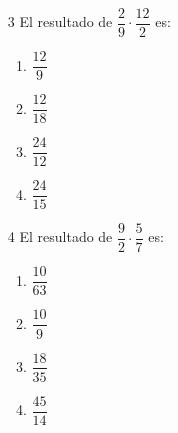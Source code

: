 \documentclass[12pt]{article}
\begin{document}
\begin{multicols}{2}
		\begin{enumerate}
		\item [3]El resultado de $\dfrac{2}{9} \cdot \dfrac{12}{2}$	es:
			\begin{enumerate}
			\item $\dfrac{12}{9}$\\
			\item $\dfrac{12}{18}$\\
			\item $\dfrac{24}{12}$\\
			\item $\dfrac{24}{15}$\\ 
	\end{enumerate}
	\end{enumerate}
\begin{enumerate}
	\item [4]El resultado de $\dfrac{9}{2} \cdot \dfrac{5}{7}$	es:
	\begin{enumerate}
		\item $\dfrac{10}{63}$\\
		\item $\dfrac{10}{9}$\\
		\item $\dfrac{18}{35}$\\
		\item $\dfrac{45}{14}$\\
	\end{enumerate}
\end{enumerate}
\end{multicols}	
\end{document}
